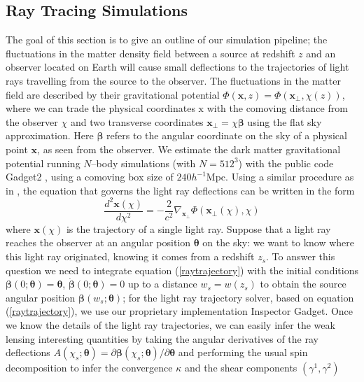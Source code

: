 \documentclass[reprint,aps,prd,superscriptaddress,showkeys,showpacs]{revtex4-1}
\begin{document}
\subsection{Ray Tracing Simulations}
\label{raysim}
The goal of this section is to give an outline of our simulation pipeline; the fluctuations in the matter density field between a source at redshift $z$ and an observer located on Earth will cause small deflections to the trajectories of light rays travelling from the source to the observer. The fluctuations in the matter field are described by their gravitational potential $\Phi(\mathbf{x},z)=\Phi(\mathbf{x}_\perp,\chi(z))$, where we can trade the physical coordinates $\mathrm{x}$ with the comoving distance from the observer $\chi$ and two transverse coordinates $\mathbf{x}_\perp=\chi\pmb{\beta}$ using the flat sky approximation. Here $\pmb{\beta}$ refers to the angular coordinate on the sky of a physical point $\mathbf{x}$, as seen from the observer. We estimate the dark matter gravitational potential running $N$--body simulations (with $N=512^3$) with the public code Gadget2 \citep{Gadget2}, using a comoving box size of $240h^{-1}$Mpc. Using a similar procedure as in \citep{RayTracingJain,RayTracingHartlap}, the equation that governs the light ray deflections can be written in the form
\begin{equation}
\label{raytrajectory}
\frac{d^2\mathbf{x}(\chi)}{d\chi^2} = -\frac{2}{c^2}\nabla_{\mathbf{x}_\perp}\Phi(\mathbf{x}_\perp(\chi),\chi)
\end{equation}
%
where $\mathbf{x}(\chi)$ is the trajectory of a single light ray. Suppose that a light ray reaches the observer at an angular position $\pmb{\theta}$ on the sky: we want to know where this light ray originated, knowing it comes from a redshift $z_s$. To answer this question we need to integrate equation (\ref{raytrajectory}) with the initial conditions $\pmb{\beta}(0;\pmb{\theta})=\pmb{\theta}$, $\dot{\pmb{\beta}}(0;\pmb{\theta})=0$ up to a distance $w_s=w(z_s)$ to obtain the source angular position $\pmb{\beta}(w_s;\pmb{\theta})$; for the light ray trajectory solver, based on equation (\ref{raytrajectory}), we use our proprietary implementation Inspector Gadget. Once we know the details of the light ray trajectories, we can easily infer the weak lensing interesting quantities by taking the angular derivatives of the ray deflections $A(\chi_s;\pmb{\theta}) = \partial \pmb{\beta}(\chi_s;\pmb{\theta})/\partial\pmb{\theta}$ and performing the usual spin decomposition to infer the convergence $\kappa$ and the shear components $(\gamma^1,\gamma^2)$
\end{document}
